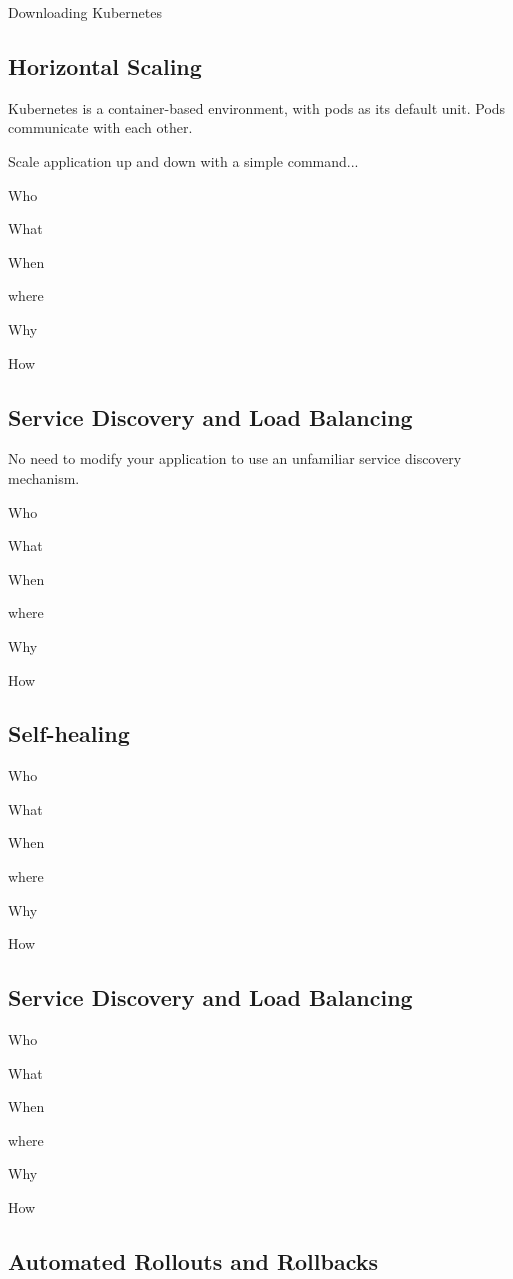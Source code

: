 Downloading Kubernetes

\subsection{Horizontal Scaling}

Kubernetes is a container-based environment, with pods as its default 
unit. Pods communicate with each other. 

Scale application up and down with a simple command...

Who

What  

When

where

Why

How

\subsection{Service Discovery and Load Balancing}

No need to modify your application to use an unfamiliar service
discovery mechanism.  

Who

What  

When

where

Why

How

\subsection{Self-healing}

Who

What  

When

where

Why

How

\subsection{Service Discovery and Load Balancing}

Who

What  

When

where

Why

How

\subsection{Automated Rollouts and Rollbacks}

